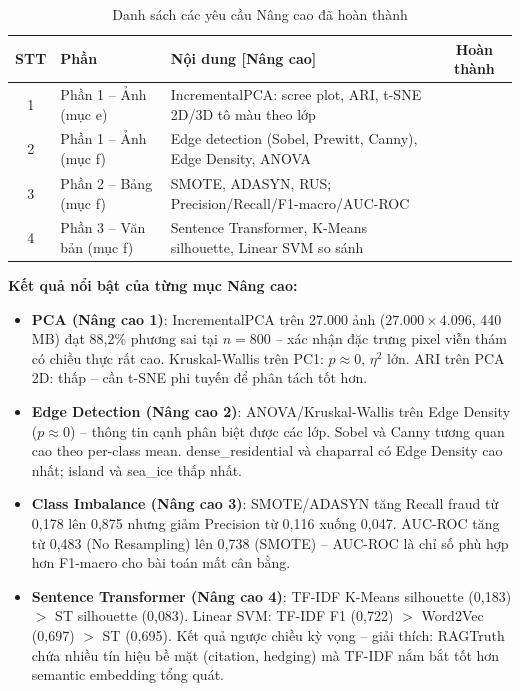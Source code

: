 \documentclass[12pt,a4paper]{article}
\newcommand{\cmark}{\ding{51}}%
\let\oldtextbf\textbf
\renewcommand{\textbf}[1]{\oldtextbf{\textcolor{hcmublue}{#1}}}
\begin{document}
\begin{table}[H]
\centering
\begin{tabular}{|c|l|l|c|}
\hline
\textbf{STT} & \textbf{Phần} & \textbf{Nội dung [Nâng cao]} & \textbf{Hoàn thành} \\ \hline
1 & Phần 1 -- Ảnh (mục e) & IncrementalPCA: scree plot, ARI, t-SNE 2D/3D tô màu theo lớp & \cmark \\ \hline
2 & Phần 1 -- Ảnh (mục f) & Edge detection (Sobel, Prewitt, Canny), Edge Density, ANOVA & \cmark \\ \hline
3 & Phần 2 -- Bảng (mục f) & SMOTE, ADASYN, RUS; Precision/Recall/F1-macro/AUC-ROC & \cmark \\ \hline
4 & Phần 3 -- Văn bản (mục f) & Sentence Transformer, K-Means silhouette, Linear SVM so sánh & \cmark \\ \hline
\end{tabular}
\caption{Danh sách các yêu cầu Nâng cao đã hoàn thành}
\label{tab:advanced_checklist}
\end{table}

\textbf{Kết quả nổi bật của từng mục Nâng cao:}

\begin{itemize}
    \item \textbf{PCA (Nâng cao 1)}: IncrementalPCA trên 27.000 ảnh ($27.000 \times 4.096$, 440 MB) đạt 88{,}2\% phương sai tại $n=800$ -- xác nhận đặc trưng pixel viễn thám có chiều thực rất cao. Kruskal-Wallis trên PC1: $p \approx 0$, $\eta^2$ lớn. ARI trên PCA 2D: thấp -- cần t-SNE phi tuyến để phân tách tốt hơn.
    \item \textbf{Edge Detection (Nâng cao 2)}: ANOVA/Kruskal-Wallis trên Edge Density ($p \approx 0$) -- thông tin cạnh phân biệt được các lớp. Sobel và Canny tương quan cao theo per-class mean. dense\_residential và chaparral có Edge Density cao nhất; island và sea\_ice thấp nhất.
    \item \textbf{Class Imbalance (Nâng cao 3)}: SMOTE/ADASYN tăng Recall fraud từ 0{,}178 lên 0{,}875 nhưng giảm Precision từ 0{,}116 xuống 0{,}047. AUC-ROC tăng từ 0{,}483 (No Resampling) lên 0{,}738 (SMOTE) -- AUC-ROC là chỉ số phù hợp hơn F1-macro cho bài toán mất cân bằng.
    \item \textbf{Sentence Transformer (Nâng cao 4)}: TF-IDF K-Means silhouette (0{,}183) $>$ ST silhouette (0{,}083). Linear SVM: TF-IDF F1 (0{,}722) $>$ Word2Vec (0{,}697) $>$ ST (0{,}695). Kết quả ngược chiều kỳ vọng -- giải thích: RAGTruth chứa nhiều tín hiệu bề mặt (citation, hedging) mà TF-IDF nắm bắt tốt hơn semantic embedding tổng quát.
\end{itemize}
\end{document}
